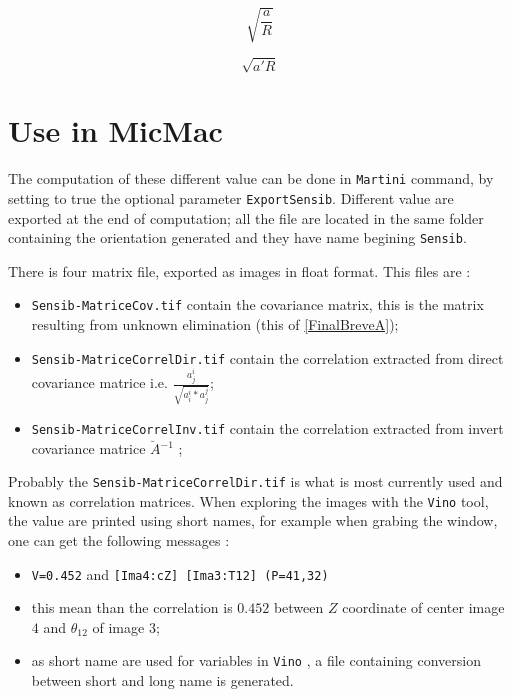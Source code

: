 \begin{equation}
  \sqrt{\frac{a}{R}}
  \label{Sens:Optim}
\end{equation}


\begin{equation}
  \sqrt{a'R}
  \label{Sens:Pess}
\end{equation}



\section{Use in MicMac}

The computation of these different value can be done in {\tt Martini} command,
by setting to true the optional parameter {\tt ExportSensib}. Different
value are exported at the end of computation; all the file are located
in the same folder containing the orientation generated and they  have name
begining  {\tt Sensib}.


There is four matrix file, exported as images in float format. This files
are : 

\begin{itemize}
     \item {\tt Sensib-MatriceCov.tif}  contain the covariance matrix,
           this is the matrix resulting from unknown elimination (this of \ref{FinalBreveA});

     \item {\tt Sensib-MatriceCorrelDir.tif}  contain the correlation extracted from
           direct covariance matrice i.e.  $ \frac{a^i_j}{\sqrt{a^i_i * a^j_j}}$;

     \item {\tt Sensib-MatriceCorrelInv.tif}  contain the correlation extracted from
           invert covariance matrice $\breve{A} {^{-1}}$  ;
\end{itemize}

Probably the {\tt Sensib-MatriceCorrelDir.tif} is what  is most currently used
and known as correlation matrices. When exploring the images with the {\tt Vino}
tool, the value are printed using short names, for example when grabing the 
window, one can get the following messages :


\begin{itemize}
     \item {\tt V=0.452} and {\tt [Ima4:cZ] [Ima3:T12] (P=41,32)}
     \item this mean than the correlation is $0.452$ between $Z$ coordinate of center
           image $4$  and $\theta_{12}$ of image $3$;
      \item as short name are used for variables in {\tt Vino} , a file containing conversion
            between short and long name is generated.
\end{itemize}


